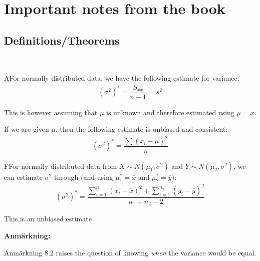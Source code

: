 \section{Important notes from the book}
\subsection{Definitions/Theorems}\hfill\\
\par\bigskip
\begin{lem}
  AFor normally distributed data, we have the following estimate for variance:
  \begin{equation*}
    \begin{gathered}
      (\sigma^2)^* = \dfrac{S_{xx}}{n-1} = s^2
    \end{gathered}
  \end{equation*}\par
  \noindent This is however assuming that $\mu$ is unknown and therefore estimated using $\mu = \overline{x}$.\par
  \noindent If we are given $\mu$, then the following estimate is unbiased and consistent:
  \begin{equation*}
    \begin{gathered}
      (\sigma^2)^* = \dfrac{\sum(x_i-\mu)^2}{n}
    \end{gathered}
  \end{equation*}
\end{lem}
\par\bigskip
\begin{lem}
  FFor normally distributed data from $X\sim N(\mu_1,\sigma^2)$ and $Y\sim N(\mu_2,\sigma^2)$, we can estimate $\sigma^2$ through (and using $\mu_1^* = \overline{x}$ and $\mu_2^*=\overline{y}$):
  \begin{equation*}
    \begin{gathered}
      (\sigma^2)^* = \dfrac{\sum_{i=1}^{n_1}(x_i-\overline{x})^2+\sum_{i=1}^{n_2}(y_i-\overline{y})^2}{n_1+n_2-2}
    \end{gathered}
  \end{equation*}
  \par\bigskip
  \noindent This is an unbiased estimate\par
\end{lem}
\par\bigskip
\noindent\textbf{Anmärkning:}\par
\noindent Anmärkning 8.2 raises the question of knowing \textit{when} the variance would be equal.\par
